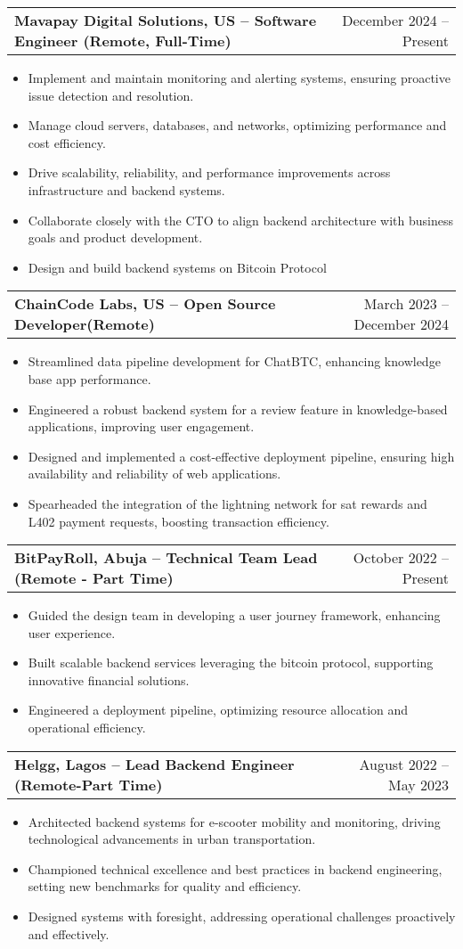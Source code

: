 \documentclass[a4paper,12pt]{article}
\makeatletter
\newenvironment{joblong}[2]{%
  \begin{tabularx}{\linewidth}{@{}X r@{}}%
    \textbf{#1} & #2 \\[3.75pt]%
  \end{tabularx}%
  \begin{minipage}[t]{\linewidth}%
  \begin{itemize}[nosep,after=\strut,leftmargin=1em,itemsep=3pt,label=--]%
  \ignorespaces
}{%
  \end{itemize}%
  \end{minipage}%
}
\makeatother
\begin{document}
\begin{joblong}{Mavapay Digital Solutions, US -- Software Engineer (Remote, Full-Time)}{December 2024 -- Present}
\item Implement and maintain monitoring and alerting systems, ensuring proactive issue detection and resolution.
\item Manage cloud servers, databases, and networks, optimizing performance and cost efficiency.
\item Drive scalability, reliability, and performance improvements across infrastructure and backend systems.
\item Collaborate closely with the CTO to align backend architecture with business goals and product development.
\item Design and build backend systems on Bitcoin Protocol
\end{joblong}


\begin{joblong}{ChainCode Labs, US -- Open Source Developer(Remote)}{March 2023 -- December 2024}
\item Streamlined data pipeline development for ChatBTC, enhancing knowledge base app performance.
\item Engineered a robust backend system for a review feature in knowledge-based applications, improving user engagement.
\item Designed and implemented a cost-effective deployment pipeline, ensuring high availability and reliability of web applications.
\item Spearheaded the integration of the lightning network for sat rewards and L402 payment requests, boosting transaction efficiency.
\end{joblong}

\begin{joblong}{BitPayRoll, Abuja -- Technical Team Lead (Remote - Part Time)}{October 2022 -- Present}
\item Guided the design team in developing a user journey framework, enhancing user experience.
\item Built scalable backend services leveraging the bitcoin protocol, supporting innovative financial solutions.
\item Engineered a deployment pipeline, optimizing resource allocation and operational efficiency.
\end{joblong}

\begin{joblong}{Helgg, Lagos -- Lead Backend Engineer (Remote-Part Time)}{August 2022 -- May 2023}
\item Architected backend systems for e-scooter mobility and monitoring, driving technological advancements in urban transportation.
\item Championed technical excellence and best practices in backend engineering, setting new benchmarks for quality and efficiency.
\item Designed systems with foresight, addressing operational challenges proactively and effectively.
\end{joblong}
\end{document}
